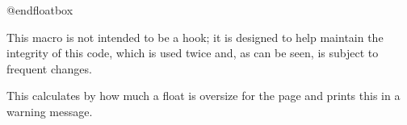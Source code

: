     \begin{teX}
      \penalty\@floatpenalty
    \end{teX}
 
    \begin{teX}
    \else
      \vadjust{\penalty -\@Miv \vbox{}\penalty\@floatpenalty}\@Esphack
    \fi
  \fi
}
    \end{teX}
 

 \begin{macro}{\end@dblfloat}
    \begin{teX}
\def\end@dblfloat{%
\if@twocolumn
  \@endfloatbox
  \ifnum\@floatpenalty <\z@
    \end{teX}
 We make sure that we never exceed |\textheight|, otherwise float
 will never get typeset (91/03/15 FMi).
    \begin{teX}
    \@largefloatcheck
    \@cons\@dbldeferlist\@currbox
  \fi
    \end{teX}
 RmS 92/03/18 changed |\@esphack| to |\@Esphack|.
    \begin{teX}
    \ifnum \@floatpenalty =-\@Mii \@Esphack\fi
\else
  \end@float
\fi
}
    \end{teX}
 \end{macro}
 
 
 
\begin{docCommand}{@endfloatbox}{ }
\end{docCommand}

    This macro is not intended to be a hook; it is designed to help
    maintain the integrity of this code, which is used twice and, as
    can be seen, is subject to frequent changes.
    \begin{teX}
\def \@endfloatbox{%
      \par\vskip\z@skip      %
    \end{teX}
   
    \begin{teX}
      \@minipagefalse   
      \outer@nobreak
    \egroup                  %
  \color@endbox
}
     \end{teX}

% 
 \begin{macro}{\outer@nobreak}
    \begin{teX}
\let\outer@nobreak\@empty
    \end{teX}
  \end{macro}
 

  \begin{macro}{\@largefloatcheck}
  \end{macro}
    This calculates by how much a float is oversize for the page and
    prints this in a warning message.
    
